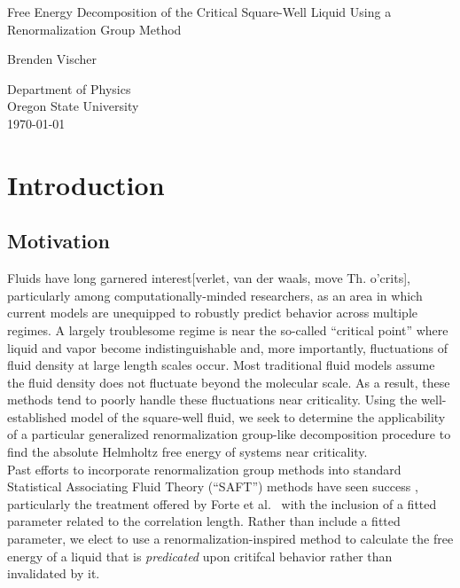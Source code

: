 \documentclass[12pt]{article}
\title
\author \\
\renewcommand{\title}{Free Energy Decomposition of the Critical Square-Well Liquid Using a Renormalization Group Method}
\renewcommand{\author}{Brenden Vischer}
\renewcommand{\titlepage}{
    {\centering
        \vspace*{4cm}
        
        \title
        
        \vspace{1.5cm}
        
        \author \\
        \text{Advisor: David Roundy}
        
        \vfill
        
        Department of Physics\\
        Oregon State University\\
        \today 
        \newpage}       
}
\begin{document}
\titlepage





\tableofcontents
\listoffigures





\section{Introduction}
\subsection{Motivation}
Fluids have long garnered interest[verlet, van der waals, move Th. o'crits], particularly among computationally-minded researchers, as an area in which current models are unequipped to robustly predict behavior across multiple regimes. A largely troublesome \cite{white2001global} regime is near the so-called ``critical point'' where liquid and vapor become indistinguishable and, more importantly, fluctuations of fluid density at large length scales occur. Most traditional fluid models assume the fluid density does not fluctuate beyond the molecular scale. As a result, these methods tend to poorly handle these fluctuations near criticality. Using the well-established model of the square-well fluid, we seek to determine the applicability of a particular generalized renormalization group-like decomposition procedure to find the absolute Helmholtz free energy of systems near criticality.\\

Past efforts to incorporate renormalization group methods into standard Statistical Associating Fluid Theory (``SAFT'') methods have seen success \cite{white2001global}, particularly the treatment offered by Forte et al.~\cite{forte2011application} with the inclusion of a fitted parameter related to the correlation length. Rather than include a fitted parameter, we elect to use a renormalization-inspired method to calculate the free energy of a liquid that is {\it predicated} upon critifcal behavior rather than invalidated by it. \\
\end{document}
